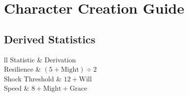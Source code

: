 \chapter{Character Creation Guide}

\section{Derived Statistics}

\begin{simpletable}{ll}
	\toprule
	Statistic & Derivation\\ %
	\midrule
	Resilience & $(5 + \text{Might}) \div 2$\\
	Shock Threshold & $12 + \text{Will}$\\
	Speed & $8 + \text{Might} + \text{Grace}$\\
	\bottomrule
\end{simpletable}
